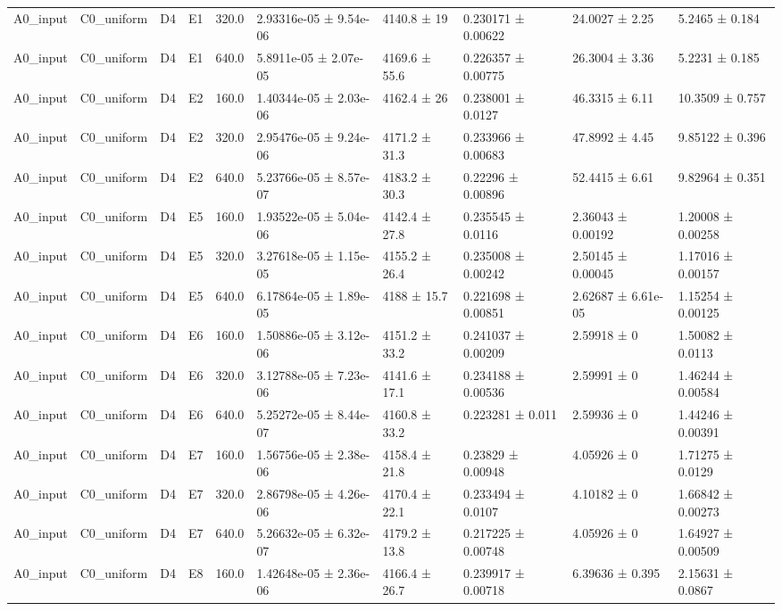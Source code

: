 \begin{table}
\begin{tabular}{llllllllll}
A0\_input & C0\_uniform & D4 & E1 & 320.0 & 2.93316e-05 ± 9.54e-06 & 4140.8 ± 19 & 0.230171 ± 0.00622 & 24.0027 ± 2.25 & 5.2465 ± 0.184 \\
A0\_input & C0\_uniform & D4 & E1 & 640.0 & 5.8911e-05 ± 2.07e-05 & 4169.6 ± 55.6 & 0.226357 ± 0.00775 & 26.3004 ± 3.36 & 5.2231 ± 0.185 \\
A0\_input & C0\_uniform & D4 & E2 & 160.0 & 1.40344e-05 ± 2.03e-06 & 4162.4 ± 26 & 0.238001 ± 0.0127 & 46.3315 ± 6.11 & 10.3509 ± 0.757 \\
A0\_input & C0\_uniform & D4 & E2 & 320.0 & 2.95476e-05 ± 9.24e-06 & 4171.2 ± 31.3 & 0.233966 ± 0.00683 & 47.8992 ± 4.45 & 9.85122 ± 0.396 \\
A0\_input & C0\_uniform & D4 & E2 & 640.0 & 5.23766e-05 ± 8.57e-07 & 4183.2 ± 30.3 & 0.22296 ± 0.00896 & 52.4415 ± 6.61 & 9.82964 ± 0.351 \\
A0\_input & C0\_uniform & D4 & E5 & 160.0 & 1.93522e-05 ± 5.04e-06 & 4142.4 ± 27.8 & 0.235545 ± 0.0116 & 2.36043 ± 0.00192 & 1.20008 ± 0.00258 \\
A0\_input & C0\_uniform & D4 & E5 & 320.0 & 3.27618e-05 ± 1.15e-05 & 4155.2 ± 26.4 & 0.235008 ± 0.00242 & 2.50145 ± 0.00045 & 1.17016 ± 0.00157 \\
A0\_input & C0\_uniform & D4 & E5 & 640.0 & 6.17864e-05 ± 1.89e-05 & 4188 ± 15.7 & 0.221698 ± 0.00851 & 2.62687 ± 6.61e-05 & 1.15254 ± 0.00125 \\
A0\_input & C0\_uniform & D4 & E6 & 160.0 & 1.50886e-05 ± 3.12e-06 & 4151.2 ± 33.2 & 0.241037 ± 0.00209 & 2.59918 ± 0 & 1.50082 ± 0.0113 \\
A0\_input & C0\_uniform & D4 & E6 & 320.0 & 3.12788e-05 ± 7.23e-06 & 4141.6 ± 17.1 & 0.234188 ± 0.00536 & 2.59991 ± 0 & 1.46244 ± 0.00584 \\
A0\_input & C0\_uniform & D4 & E6 & 640.0 & 5.25272e-05 ± 8.44e-07 & 4160.8 ± 33.2 & 0.223281 ± 0.011 & 2.59936 ± 0 & 1.44246 ± 0.00391 \\
A0\_input & C0\_uniform & D4 & E7 & 160.0 & 1.56756e-05 ± 2.38e-06 & 4158.4 ± 21.8 & 0.23829 ± 0.00948 & 4.05926 ± 0 & 1.71275 ± 0.0129 \\
A0\_input & C0\_uniform & D4 & E7 & 320.0 & 2.86798e-05 ± 4.26e-06 & 4170.4 ± 22.1 & 0.233494 ± 0.0107 & 4.10182 ± 0 & 1.66842 ± 0.00273 \\
A0\_input & C0\_uniform & D4 & E7 & 640.0 & 5.26632e-05 ± 6.32e-07 & 4179.2 ± 13.8 & 0.217225 ± 0.00748 & 4.05926 ± 0 & 1.64927 ± 0.00509 \\
A0\_input & C0\_uniform & D4 & E8 & 160.0 & 1.42648e-05 ± 2.36e-06 & 4166.4 ± 26.7 & 0.239917 ± 0.00718 & 6.39636 ± 0.395 & 2.15631 ± 0.0867 \\

\end{tabular}
\end{table}
